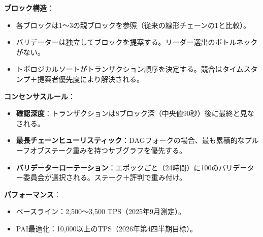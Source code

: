 \documentclass[11pt]{article}
\begin{document}
\textbf{ブロック構造}：
\begin{itemize}[noitemsep]
  \item 各ブロックは1〜3の親ブロックを参照（従来の線形チェーンの1と比較）。
  \item バリデーターは独立してブロックを提案する。リーダー選出のボトルネックがない。
  \item トポロジカルソートがトランザクション順序を決定する。競合はタイムスタンプ＋提案者優先度により解決される。
\end{itemize}

\textbf{コンセンサスルール}：
\begin{itemize}[noitemsep]
  \item \textbf{確認深度}：トランザクションは8ブロック深（中央値90秒）後に最終と見なされる。
  \item \textbf{最長チェーンヒューリスティック}：DAGフォークの場合、最も累積的なプルーフオブステーク重みを持つサブグラフを優先する。
  \item \textbf{バリデーターローテーション}：エポックごと（24時間）に100のバリデーター委員会が選択される。ステーク＋評判で重み付け。
\end{itemize}

\textbf{パフォーマンス}：
\begin{itemize}[noitemsep]
  \item ベースライン：2,500〜3,500 TPS（2025年9月測定）。
  \item PAI最適化：10,000以上のTPS（2026年第4四半期目標）。
\end{itemize}
\end{document}
